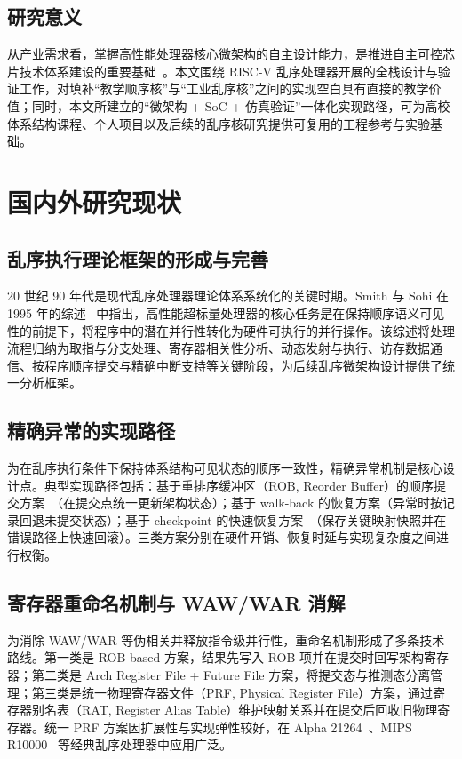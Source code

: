 \subsection{研究意义}

从产业需求看，掌握高性能处理器核心微架构的自主设计能力，是推进自主可控芯片技术体系建设的重要基础~\cite{csia2024report}。本文围绕 RISC-V 乱序处理器开展的全栈设计与验证工作，对填补“教学顺序核”与“工业乱序核”之间的实现空白具有直接的教学价值；同时，本文所建立的“微架构 + SoC + 仿真验证”一体化实现路径，可为高校体系结构课程、个人项目以及后续的乱序核研究提供可复用的工程参考与实验基础。

\section{国内外研究现状}

\subsection{乱序执行理论框架的形成与完善}

20 世纪 90 年代是现代乱序处理器理论体系系统化的关键时期。Smith 与 Sohi 在 1995 年的综述~\cite{smith1995superscalar} 中指出，高性能超标量处理器的核心任务是在保持顺序语义可见性的前提下，将程序中的潜在并行性转化为硬件可执行的并行操作。该综述将处理流程归纳为取指与分支处理、寄存器相关性分析、动态发射与执行、访存数据通信、按程序顺序提交与精确中断支持等关键阶段，为后续乱序微架构设计提供了统一分析框架。

\subsection{精确异常的实现路径}

为在乱序执行条件下保持体系结构可见状态的顺序一致性，精确异常机制是核心设计点。典型实现路径包括：基于重排序缓冲区（ROB, Reorder Buffer）的顺序提交方案~\cite{smith1988precise}（在提交点统一更新架构状态）；基于 walk-back 的恢复方案（异常时按记录回退未提交状态）；基于 checkpoint 的快速恢复方案~\cite{hwu1987checkpoint}（保存关键映射快照并在错误路径上快速回滚）。三类方案分别在硬件开销、恢复时延与实现复杂度之间进行权衡。

\subsection{寄存器重命名机制与 WAW/WAR 消解}

为消除 WAW/WAR 等伪相关并释放指令级并行性，重命名机制形成了多条技术路线。第一类是 ROB-based 方案，结果先写入 ROB 项并在提交时回写架构寄存器；第二类是 Arch Register File + Future File 方案，将提交态与推测态分离管理；第三类是统一物理寄存器文件（PRF, Physical Register File）方案，通过寄存器别名表（RAT, Register Alias Table）维护映射关系并在提交后回收旧物理寄存器。统一 PRF 方案因扩展性与实现弹性较好，在 Alpha 21264~\cite{kessler1999alpha}、MIPS R10000~\cite{yeager1996r10000} 等经典乱序处理器中应用广泛。

